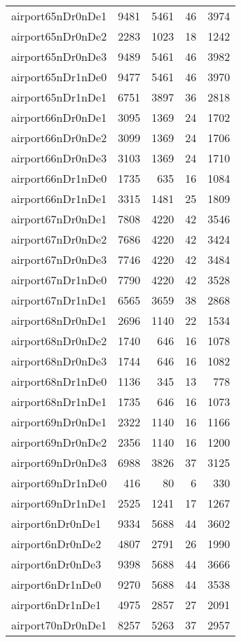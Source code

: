 \documentclass[../../../thesis.tex]{subfiles}
\begin{document}
\begin{longtable}{lrrrr}
airport65nDr0nDe1 & 9481 & 5461 & 46 & 3974 \\
airport65nDr0nDe2 & 2283 & 1023 & 18 & 1242 \\
airport65nDr0nDe3 & 9489 & 5461 & 46 & 3982 \\
airport65nDr1nDe0 & 9477 & 5461 & 46 & 3970 \\
airport65nDr1nDe1 & 6751 & 3897 & 36 & 2818 \\
airport66nDr0nDe1 & 3095 & 1369 & 24 & 1702 \\
airport66nDr0nDe2 & 3099 & 1369 & 24 & 1706 \\
airport66nDr0nDe3 & 3103 & 1369 & 24 & 1710 \\
airport66nDr1nDe0 & 1735 & 635 & 16 & 1084 \\
airport66nDr1nDe1 & 3315 & 1481 & 25 & 1809 \\
airport67nDr0nDe1 & 7808 & 4220 & 42 & 3546 \\
airport67nDr0nDe2 & 7686 & 4220 & 42 & 3424 \\
airport67nDr0nDe3 & 7746 & 4220 & 42 & 3484 \\
airport67nDr1nDe0 & 7790 & 4220 & 42 & 3528 \\
airport67nDr1nDe1 & 6565 & 3659 & 38 & 2868 \\
airport68nDr0nDe1 & 2696 & 1140 & 22 & 1534 \\
airport68nDr0nDe2 & 1740 & 646 & 16 & 1078 \\
airport68nDr0nDe3 & 1744 & 646 & 16 & 1082 \\
airport68nDr1nDe0 & 1136 & 345 & 13 & 778 \\
airport68nDr1nDe1 & 1735 & 646 & 16 & 1073 \\
airport69nDr0nDe1 & 2322 & 1140 & 16 & 1166 \\
airport69nDr0nDe2 & 2356 & 1140 & 16 & 1200 \\
airport69nDr0nDe3 & 6988 & 3826 & 37 & 3125 \\
airport69nDr1nDe0 & 416 & 80 & 6 & 330 \\
airport69nDr1nDe1 & 2525 & 1241 & 17 & 1267 \\
airport6nDr0nDe1 & 9334 & 5688 & 44 & 3602 \\
airport6nDr0nDe2 & 4807 & 2791 & 26 & 1990 \\
airport6nDr0nDe3 & 9398 & 5688 & 44 & 3666 \\
airport6nDr1nDe0 & 9270 & 5688 & 44 & 3538 \\
airport6nDr1nDe1 & 4975 & 2857 & 27 & 2091 \\
airport70nDr0nDe1 & 8257 & 5263 & 37 & 2957 \\

\end{longtable}
\end{document}
